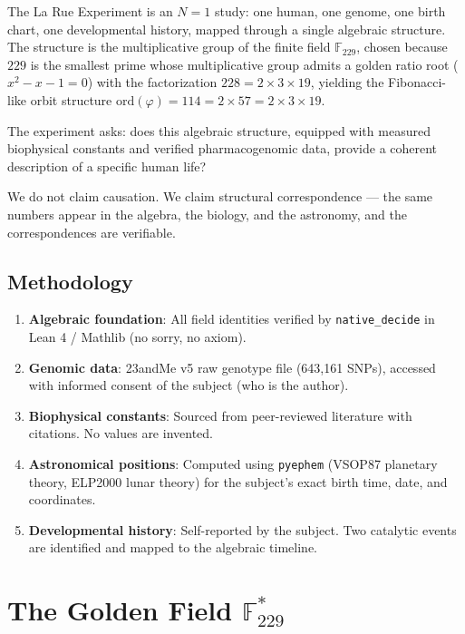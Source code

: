 \documentclass[12pt, letterpaper]{article}
\begin{document}
The La Rue Experiment is an $N=1$ study: one human, one genome, one birth chart, one developmental history, mapped through a single algebraic structure. The structure is the multiplicative group of the finite field $\mathbb{F}_{229}$, chosen because $229$ is the smallest prime whose multiplicative group admits a golden ratio root ($x^2 - x - 1 = 0$) with the factorization $228 = 2 \times 3 \times 19$, yielding the Fibonacci-like orbit structure $\mathrm{ord}(\varphi) = 114 = 2 \times 57 = 2 \times 3 \times 19$.

The experiment asks: does this algebraic structure, equipped with measured biophysical constants and verified pharmacogenomic data, provide a coherent description of a specific human life?

We do not claim causation. We claim structural correspondence --- the same numbers appear in the algebra, the biology, and the astronomy, and the correspondences are verifiable.

\subsection{Methodology}

\begin{enumerate}
    \item \textbf{Algebraic foundation}: All field identities verified by \texttt{native\_decide} in Lean 4 / Mathlib (no sorry, no axiom).
    \item \textbf{Genomic data}: 23andMe v5 raw genotype file (643,161 SNPs), accessed with informed consent of the subject (who is the author).
    \item \textbf{Biophysical constants}: Sourced from peer-reviewed literature with citations. No values are invented.
    \item \textbf{Astronomical positions}: Computed using \texttt{pyephem} (VSOP87 planetary theory, ELP2000 lunar theory) for the subject's exact birth time, date, and coordinates.
    \item \textbf{Developmental history}: Self-reported by the subject. Two catalytic events are identified and mapped to the algebraic timeline.
\end{enumerate}

\section{The Golden Field $\mathbb{F}^*_{229}$}
\end{document}
